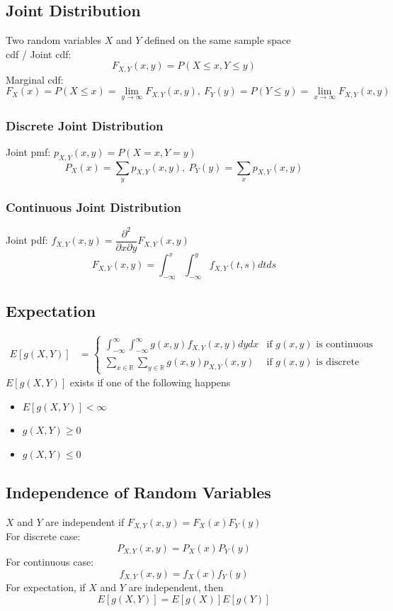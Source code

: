 \documentclass[11pt]{article}
\newcommand{\R}{{\mathbb{R}}}
\newcommand{\ds}{\displaystyle}
\begin{document}
\subsection{Joint Distribution}
Two random variables $X$ and $Y$ defined on the same sample space \\
cdf / Joint cdf: \[F_{X,Y}(x,y)=P(X\leq x, Y\leq y)\] 
Marginal cdf: \[F_X(x)=P(X\leq x)=\lim_{y\to\infty}F_{X,Y}(x,y),\ F_Y(y)=P(Y\leq y)=\lim_{x\to\infty}F_{X,Y}(x,y)\]
\subsubsection{Discrete Joint Distribution}
Joint pmf: $p_{X,Y}(x,y)=P(X=x, Y=y)$ 
\[P_X(x)=\sum_{y}p_{X,Y}(x,y),\ P_Y(y)=\sum_{x}p_{X,Y}(x,y)\] 
\subsubsection{Continuous Joint Distribution}
Joint pdf: $f_{X,Y}(x,y)=\dfrac{\partial^2}{\partial x \partial y}F_{X,Y}(x,y)$ 
\[F_{X,Y}(x,y)=\int_{-\infty}^{x}\int_{-\infty}^{y}f_{X,Y}(t,s)dtds\]
\subsection{Expectation}
\begin{align*}
    E[g(X,Y)] &= \begin{cases}
        \ds\int_{-\infty}^{\infty}\int_{-\infty}^{\infty}g(x,y)f_{X,Y}(x,y)dydx & \text{if } g(x,y) \text{ is continuous} \\
        \ds\sum_{x\in\R}\sum_{y\in\R}g(x,y)p_{X,Y}(x,y) & \text{if } g(x,y) \text{ is discrete}
    \end{cases}
\end{align*}
$E[g(X,Y)]$ exists if one of the following happens
\begin{itemize}
    \item $E[g(X,Y)]<\infty$
    \item $g(X,Y)\geq0$
    \item $g(X,Y)\leq0$
\end{itemize}
\subsection{Independence of Random Variables}
$X$ and $Y$ are independent if $F_{X,Y}(x,y)=F_X(x)F_Y(y)$ \\
For discrete case: \[P_{X,Y}(x,y)=P_X(x)P_Y(y)\] 
For continuous case: \[f_{X,Y}(x,y)=f_X(x)f_Y(y)\]
For expectation, if $X$ and $Y$ are independent, then \[E[g(X,Y)]=E[g(X)]E[g(Y)]\]
\end{document}
